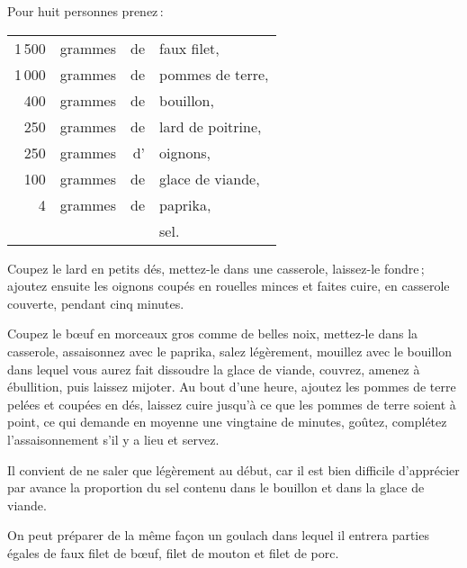 Pour huit personnes prenez :

\medskip

\footnotesize
\begin{longtable}{rrrp{16em}}
  1 500 & grammes & de & faux filet,                                                                      \\
  1 000 & grammes & de & pommes de terre,                                                                 \\
    400 & grammes & de & bouillon,                                                                        \\
    250 & grammes & de & lard de poitrine,                                                                \\
    250 & grammes & d' & oignons,                                                                         \\
    100 & grammes & de & glace de viande,                                                                 \\
      4 & grammes & de & paprika,                                                                         \\
        &         &    & sel.                                                                             \\
\end{longtable}
\normalsize

Coupez le lard en petits dés, mettez-le dans une casserole, laissez-le fondre ;
ajoutez ensuite les oignons coupés en rouelles minces et faites cuire, en
casserole couverte, pendant cinq minutes.

Coupez le bœuf en morceaux gros comme de belles noix, mettez-le dans la
casserole, assaisonnez avec le paprika, salez légèrement, mouillez avec le
bouillon dans lequel vous aurez fait dissoudre la glace de viande, couvrez,
amenez à ébullition, puis laissez mijoter. Au bout d'une heure, ajoutez les
pommes de terre pelées et coupées en dés, laissez cuire jusqu'à ce que les
pommes de terre soient à point, ce qui demande en moyenne une vingtaine de
minutes, goûtez, complétez l'assaisonnement s'il y a lieu et servez.

Il convient de ne saler que légèrement au début, car il est bien difficile
d'apprécier par avance la proportion du sel contenu dans le bouillon et dans la
glace de viande.

\sk

On peut préparer de la même façon un goulach dans lequel il entrera parties
égales de faux filet de bœuf, filet de mouton et filet de porc.

